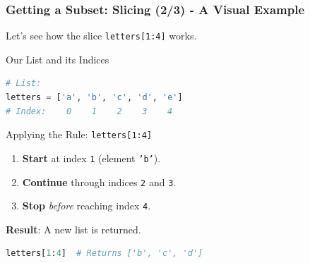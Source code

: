 \documentclass{beamer}
\begin{document}
\begin{frame}[fragile]
    \frametitle{Getting a Subset: Slicing (2/3) - A Visual Example}
    
    Let's see how the slice \texttt{letters[1:4]} works.
    
    \begin{block}{Our List and its Indices}
\begin{lstlisting}[language=Python]
# List:
letters = ['a', 'b', 'c', 'd', 'e']
# Index:    0    1    2    3    4 
\end{lstlisting}
    \end{block}
    
    \begin{exampleblock}{Applying the Rule: \texttt{letters[1:4]}}
        \begin{enumerate}
            \item \textbf{Start} at index \texttt{1} (element \texttt{'b'}).
            \item \textbf{Continue} through indices \texttt{2} and \texttt{3}.
            \item \textbf{Stop} \textit{before} reaching index \texttt{4}.
        \end{enumerate}
    \end{exampleblock}
    
    \textbf{Result}: A new list is returned.
\begin{lstlisting}[language=Python]
letters[1:4]  # Returns ['b', 'c', 'd']
\end{lstlisting}
    
\end{frame}
\end{document}
